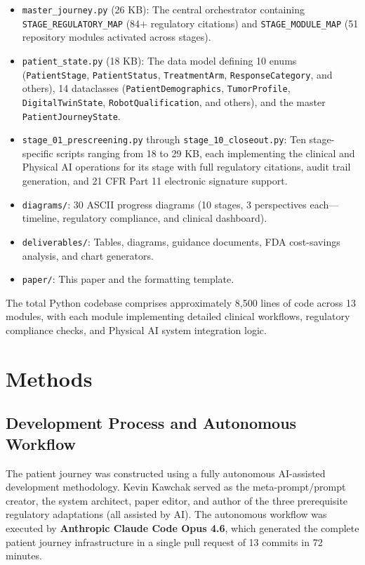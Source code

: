 \documentclass{article}
\begin{document}
\begin{itemize}[leftmargin=*]
\item \texttt{master\_journey.py} (26 KB): The central orchestrator containing \texttt{STAGE\_REGULATORY\_MAP} (84+ regulatory citations) and \texttt{STAGE\_MODULE\_MAP} (51 repository modules activated across stages).
\item \texttt{patient\_state.py} (18 KB): The data model defining 10 enums (\texttt{PatientStage}, \texttt{PatientStatus}, \texttt{TreatmentArm}, \texttt{ResponseCategory}, and others), 14 dataclasses (\texttt{PatientDemographics}, \texttt{TumorProfile}, \texttt{DigitalTwinState}, \texttt{RobotQualification}, and others), and the master \texttt{PatientJourneyState}.
\item \texttt{stage\_01\_prescreening.py} through \texttt{stage\_10\_closeout.py}: Ten stage-specific scripts ranging from 18 to 29 KB, each implementing the clinical and Physical AI operations for its stage with full regulatory citations, audit trail generation, and 21 CFR Part 11 electronic signature support.
\item \texttt{diagrams/}: 30 ASCII progress diagrams (10 stages, 3 perspectives each---timeline, regulatory compliance, and clinical dashboard).
\item \texttt{deliverables/}: Tables, diagrams, guidance documents, FDA cost-savings analysis, and chart generators.
\item \texttt{paper/}: This paper and the formatting template.
\end{itemize}

The total Python codebase comprises approximately 8,500 lines of code across 13 modules, with each module implementing detailed clinical workflows, regulatory compliance checks, and Physical AI system integration logic.

\section{Methods}
\label{sec:methods}

\subsection{Development Process and Autonomous Workflow}

The patient journey was constructed using a fully autonomous AI-assisted development methodology. Kevin Kawchak served as the meta-prompt/prompt creator, the system architect, paper editor, and author of the three prerequisite regulatory adaptations (all assisted by AI). The autonomous workflow was executed by \textbf{Anthropic Claude Code Opus 4.6}, which generated the complete patient journey infrastructure in a single pull request of 13 commits in 72 minutes.
\end{document}
